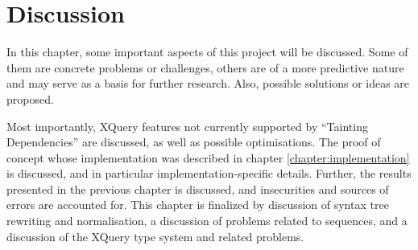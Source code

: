 \chapter{Discussion}
\label{chapter:discussion}
In this chapter, some important aspects of this project will be discussed. Some
of them are concrete problems or challenges, others are of a more predictive
nature and may serve as a basis for further research. Also, possible
solutions or ideas are proposed. 

Most importantly, XQuery features not
currently supported by ``Tainting Dependencies'' are discussed, as well as
possible optimisations. The proof of concept whose implementation was
described in chapter \ref{chapter:implementation} is discussed, and in
particular implementation-specific details. Further, the results presented in
the previous chapter is discussed, and insecurities and sources of errors are
accounted for. This chapter is finalized by discussion of syntax tree rewriting
and normalisation, a discussion of problems related to sequences, and a
discussion of the XQuery type system and related problems.








